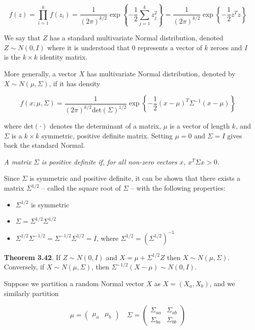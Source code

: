 \[ f(z) = \prod_{i=1}^{k} f(z_{i}) 
= \frac{1}{(2 \pi)^{k/2}} \exp \left\{ -\frac{1}{2} \sum_{j=1}^{k} z_{j}^{2} \right\} 
= \frac{1}{(2 \pi)^{k/2}} \exp \left\{ -\frac{1}{2} z^T z \right\} 
\]

We say that \(Z\) has a standard multivariate Normal distribution,
denoted \(Z \sim N(0, I)\) where it is understood that \(0\) represents
a vector of \(k\) zeroes and \(I\) is the \(k \times k\) identity
matrix.

More generally, a vector \(X\) has multivariate Normal distribution,
denoted by \(X \sim N(\mu, \Sigma)\), if it has density

\[ f(x; \mu, \Sigma) = \frac{1}{(2 \pi)^{k/2} \text{det}(\Sigma)^{1/2}} \exp \left\{ - \frac{1}{2} (x - \mu)^T \Sigma^{-1} (x - \mu) \right\} \]

where \(\text{det}(\cdot)\) denotes the determinant of a matrix, \(\mu\)
is a vector of length \(k\), and \(\Sigma\) is a \(k \times k\)
symmetric, positive definite matrix. Setting \(\mu = 0\) and
\(\Sigma = I\) gives back the standard Normal.

\emph{A matrix \(\Sigma\) is positive definite if, for all non-zero vectors \(x\), \(x^T \Sigma x > 0\).}

Since \(\Sigma\) is symmetric and positive definite, it can be shown
that there exists a matrix \(\Sigma^{1/2}\) -- called the square root of
\(\Sigma\) -- with the following properties:

\begin{itemize}[tightlist]
\item
  \(\Sigma^{1/2}\) is symmetric
\item
  \(\Sigma = \Sigma^{1/2} \Sigma^{1/2}\)
\item
  \(\Sigma^{1/2}\Sigma^{-1/2} = \Sigma^{-1/2}\Sigma^{1/2} = I\), where
  \(\Sigma^{1/2} = \left(\Sigma^{1/2}\right)^{-1}\)
\end{itemize}

\textbf{Theorem 3.42}. If \(Z \sim N(0, I)\) and
\(X = \mu + \Sigma^{1/2} Z\) then \(X \sim N(\mu, \Sigma)\). Conversely,
if \(X \sim N(\mu, \Sigma)\), then
\(\Sigma^{-1/2}(X - \mu) \sim N(0, I)\).

Suppose we partition a random Normal vector \(X\) as \(X = (X_a, X_b)\),
and we similarly partition

\[ \mu = \begin{pmatrix}\mu_a & \mu_b \end{pmatrix} 
\quad
\Sigma = \begin{pmatrix}
\Sigma_{aa} & \Sigma_{ab} \\
\Sigma_{ba} & \Sigma_{bb}
\end{pmatrix} \]

